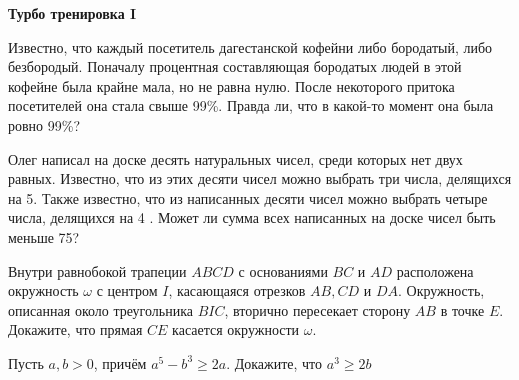 \centerline{\bf \Huge Турбо тренировка I}
\centerline{\bf \Huge }

\begin{flushright}
        \scriptsize{}
\end{flushright}

Известно, что каждый посетитель дагестанской кофейни либо бородатый, либо безбородый. Поначалу процентная составляющая бородатых людей в этой кофейне была крайне мала, но  не равна нулю. После некоторого притока посетителей она стала свыше 99\%. Правда ли, что в какой-то момент она была ровно 99\%?

Олег написал на доске десять натуральных чисел, среди которых нет двух равных. Известно, что из этих десяти чисел можно выбрать три числа, делящихся на 5. Также известно, что из написанных десяти чисел можно выбрать четыре числа, делящихся на 4 . Может ли сумма всех написанных на доске чисел быть меньше 75?

Внутри равнобокой трапеции $A B C D$ с основаниями $B C$ и $A D$ расположена окружность $\omega$ с центром $I$, касающаяся отрезков $A B, C D$ и $D A$. Окружность, описанная около треугольника $B I C$, вторично пересекает сторону $A B$ в точке $E$. Докажите, что прямая $C E$ касается окружности $\omega$.

Пусть $a,b > 0$, причём $a^5 - b^3\geqslant 2a$. Докажите, что $a^3 \geqslant 2b$